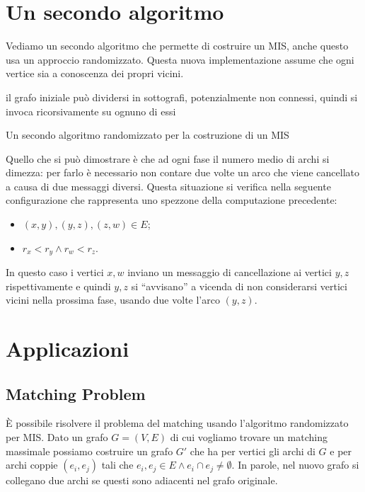 \documentclass{article}
\begin{document}
\section{Un secondo algoritmo}
Vediamo un secondo algoritmo che permette di costruire un MIS, anche questo
usa un approccio randomizzato. Questa nuova implementazione assume che ogni
vertice sia a conoscenza dei propri vicini.
\begin{algorithm}
 \SetAlgoLined
    il grafo iniziale pu\`o dividersi in sottografi, potenzialmente
    non connessi, quindi si invoca ricorsivamente su ognuno di essi
 \caption{Un secondo algoritmo randomizzato per la costruzione di un MIS}
\end{algorithm}

Quello che si pu\`o dimostrare \`e che ad ogni fase il numero medio di archi
si dimezza: per farlo \`e necessario non contare due volte un arco che
viene cancellato a causa di due messaggi diversi. Questa situazione si
verifica nella seguente configurazione che rappresenta uno spezzone della
computazione precedente:
\begin{itemize}
    \item $(x,y),(y,z),(z,w) \in E$;
    \item $r_x < r_y \wedge r_w < r_z$.
\end{itemize}
In questo caso i vertici $x,w$ inviano un messaggio di cancellazione ai vertici $
y,z$ rispettivamente e quindi $y,z$ si ``avvisano'' a vicenda di non
considerarsi vertici vicini nella prossima fase, usando due volte l'arco
$(y,z)$.

\section{Applicazioni}

\subsection{Matching Problem}
\`E possibile risolvere il problema del matching usando l'algoritmo
randomizzato per MIS. Dato un grafo $G = (V,E)$ di cui vogliamo trovare 
un matching massimale possiamo costruire un grafo $G'$ che ha per vertici
gli archi di $G$ e per archi coppie $(e_i, e_j)$ tali che $e_i, e_j \in E
\wedge e_i \cap e_j \not = \emptyset$. In parole, nel nuovo grafo si collegano
due archi se questi sono adiacenti nel grafo originale.
\end{document}
